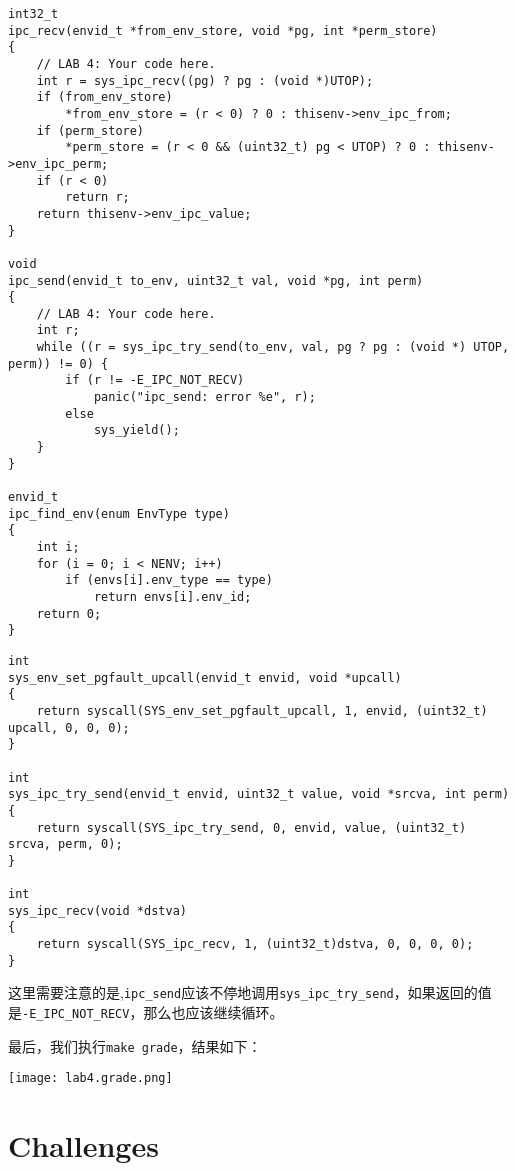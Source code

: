 \documentclass[11pt]{article}
\begin{document}
\begin{lstlisting}[title=lib/ipc.c]
int32_t
ipc_recv(envid_t *from_env_store, void *pg, int *perm_store)
{
	// LAB 4: Your code here.
	int r = sys_ipc_recv((pg) ? pg : (void *)UTOP);
    if (from_env_store)
        *from_env_store = (r < 0) ? 0 : thisenv->env_ipc_from;
    if (perm_store)
        *perm_store = (r < 0 && (uint32_t) pg < UTOP) ? 0 : thisenv->env_ipc_perm;
    if (r < 0)
        return r;
    return thisenv->env_ipc_value;
}

void
ipc_send(envid_t to_env, uint32_t val, void *pg, int perm)
{
	// LAB 4: Your code here.
	int r;
    while ((r = sys_ipc_try_send(to_env, val, pg ? pg : (void *) UTOP, perm)) != 0) {
        if (r != -E_IPC_NOT_RECV)
            panic("ipc_send: error %e", r);
        else
        	sys_yield();
    }
}

envid_t
ipc_find_env(enum EnvType type)
{
	int i;
	for (i = 0; i < NENV; i++)
		if (envs[i].env_type == type)
			return envs[i].env_id;
	return 0;
}
\end{lstlisting}

\begin{lstlisting}[title=lib/syscall.c]
int
sys_env_set_pgfault_upcall(envid_t envid, void *upcall)
{
	return syscall(SYS_env_set_pgfault_upcall, 1, envid, (uint32_t) upcall, 0, 0, 0);
}

int
sys_ipc_try_send(envid_t envid, uint32_t value, void *srcva, int perm)
{
	return syscall(SYS_ipc_try_send, 0, envid, value, (uint32_t) srcva, perm, 0);
}

int
sys_ipc_recv(void *dstva)
{
	return syscall(SYS_ipc_recv, 1, (uint32_t)dstva, 0, 0, 0, 0);
}
\end{lstlisting}
这里需要注意的是,\lstinline|ipc_send|应该不停地调用\lstinline|sys_ipc_try_send|，如果返回的值是\lstinline|-E_IPC_NOT_RECV|，那么也应该继续循环。

最后，我们执行\lstinline|make grade|，结果如下：
\begin{center}
\texttt{[image: lab4.grade.png]}
\end{center}

\section{Challenges}
\end{document}
